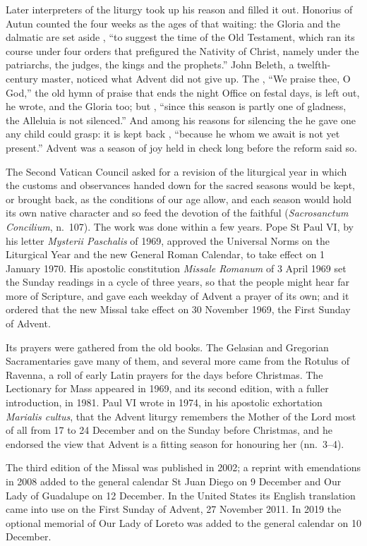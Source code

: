 Later interpreters of the liturgy took up his reason and filled it out.
Honorius of Autun counted the four weeks as the ages of that waiting: the Gloria and the dalmatic are set aside
, ``to suggest the time of the Old
Testament, which ran its course under four orders that prefigured the Nativity
of Christ, namely under the patriarchs, the judges, the kings and the
prophets.'' John Beleth, a twelfth-century master, noticed what Advent did
not give up.
The , ``We praise thee, O God,'' the old hymn of praise
that ends the night Office on festal days, is left out, he wrote, and the Gloria
too; but ,
``since this season is partly one of gladness, the Alleluia is not silenced.''
And among his reasons for silencing the  he gave one any child could grasp: it is kept back ,
``because he whom we await is not yet present.'' Advent was a season of joy held
in check long before the reform said so.

The Second Vatican Council asked for a revision of the liturgical year in which
the customs and observances handed down for the sacred seasons would be kept,
or brought back, as the conditions of our age allow, and each season would hold
its own native character and so feed the devotion of the faithful
(\emph{Sacrosanctum Concilium}, n.~107). The work was done within a few
years. Pope St Paul VI, by his letter \emph{Mysterii Paschalis} of 1969, approved
the Universal Norms on the Liturgical Year and the new General Roman Calendar,
to take effect on 1 January 1970. His apostolic constitution \emph{Missale Romanum} of 3 April 1969 set the
Sunday readings in a cycle of three years, so that the people might hear far
more of Scripture, and gave each weekday of Advent a prayer of its own; and it
ordered that the new Missal take effect on 30 November 1969, the First Sunday
of Advent.

Its prayers were gathered from the old books. The Gelasian and Gregorian
Sacramentaries gave many of them, and several more came from the Rotulus of
Ravenna, a roll of early Latin prayers for the days before Christmas. The
Lectionary for Mass appeared in 1969, and its second edition, with a fuller
introduction, in 1981. Paul VI wrote in 1974, in his apostolic exhortation
\emph{Marialis cultus}, that the Advent liturgy remembers the Mother of the
Lord most of all from 17 to 24 December and on the Sunday before Christmas, and
he endorsed the view that Advent is a fitting season for honouring her
(nn.~3--4).

The third edition of the Missal was published in 2002; a reprint with
emendations in 2008 added to the general calendar St Juan Diego on 9 December
and Our Lady of Guadalupe on 12 December. In the United States its English
translation came into use on the First Sunday of Advent, 27 November 2011. In
2019 the optional memorial of Our Lady of Loreto was added to the general
calendar on 10 December.
